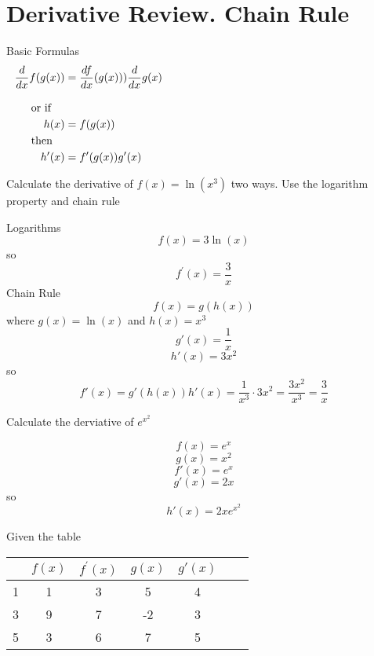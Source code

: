 \section*{Derivative Review. Chain Rule}

Basic Formulas
\begin{equation*}
  \begin{aligned}
    \frac{d}{dx} f(g(x)) &= \frac{df}{dx}(g(x)))\frac{d}{dx} g(x) \\
    \noalign{\vspace{1 em}or if}
    h(x) &= f(g(x)) \\
    \noalign{then}
    h'(x) &= f^\prime(g(x))g'(x) \\
  \end{aligned}
\end{equation*}

\begin{questions}
\question
Calculate the derivative of $f(x)=\ln (x^3)$ two ways. Use the logarithm property and chain rule
\begin{solution}[1.5in]
  Logarithms
  $$f(x) = 3 \ln(x)$$
  so
  $$f^\prime(x)=\frac{3}{x}$$
  Chain Rule
  $$f(x)=g(h(x))$$
  where   $g(x)=\ln(x)$ and $h(x)=x^3$
  $$g'(x) = \frac{1}{x}$$
  $$h'(x) = 3x^2$$
  so
  $$f'(x)=g'(h(x))h'(x) = \frac{1}{x^3}\cdot 3x^2 = \frac{3x^2}{x^3} = \frac{3}{x}$$
\end{solution}
\question
Calculate the derviative of $e^{x^2}$
\begin{solution}[1.5in]
  $$f(x)=e^{x}$$
  $$g(x)=x^2$$
  $$f'(x)=e^{x}$$
  $$g'(x)=2x$$
  so
  $$h'(x) = 2xe^{x^2}$$
\end{solution}
\question
Given the table
  \begin{tabular}{c|cccccc}
    \hline
    & $f(x)$ & $f^\prime(x)$ & $g(x)$ & $g'(x)$ \\
    \hline
    1& 1 & 3 & 5 & 4 \\
    \hline
    3& 9 & 7 & -2 & 3 \\
    \hline
    5 &3 & 6 & 7 & 5 \\
    \hline
  \end{tabular}
  \vspace{1em}
\end{questions}
